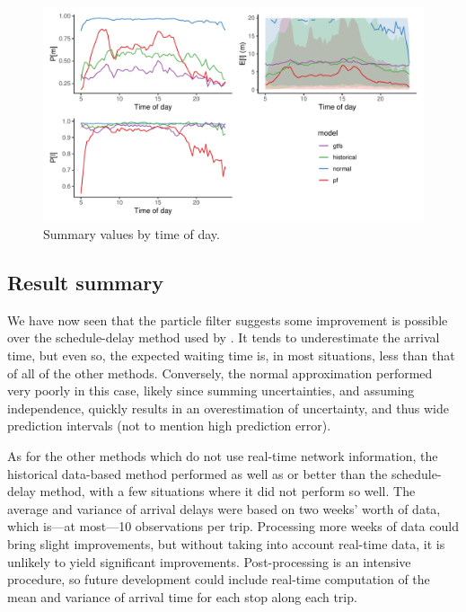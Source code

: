 \begin{knitrout}\small
{}\color{fgcolor}\begin{figure}
\includegraphics[width=\textwidth]{figure/model_results_pr_timeofday-1} \caption[Summary values by time of day]{Summary values by time of day.}\label{fig:model_results_pr_timeofday}
\end{figure}


\end{knitrout}



\subsection{Result summary}
\label{sec:prediction_model_comp_summary}

We have now seen that the particle filter suggests some improvement is possible over the schedule-delay method used by \AT. It tends to underestimate the arrival time, but even so, the expected waiting time is, in most situations, less than that of all of the other methods. Conversely, the normal approximation performed very poorly in this case, likely since summing uncertainties, and assuming independence, quickly results in an overestimation of uncertainty, and thus wide prediction intervals (not to mention high prediction error).

As for the other methods which do not use real-time network information, the historical data-based method performed as well as or better than the schedule-delay method, with a few situations where it did not perform so well. The average and variance of arrival delays were based on two weeks' worth of data, which is---at most---10 observations per trip. Processing more weeks of data could bring slight improvements, but without taking into account real-time data, it is unlikely to yield significant improvements. Post-processing is an intensive procedure, so future development could include real-time computation of the mean and variance of arrival time for each stop along each trip.
